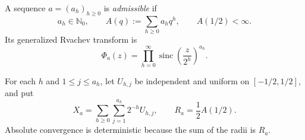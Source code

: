 \documentclass[11pt,oneside]{article}
\numberwithin{equation}{section}
\theoremstyle{definition}
\theoremstyle{remark}
\newcommand{\N}{\mathbb N}
\newcommand{\sinc}{\operatorname{sinc}}
\begin{document}
\begin{definition}
A sequence $a=(a_h)_{h\ge0}$ is \emph{admissible} if
\[
 a_h\in\N_0,
 \qquad
 A(q):=\sum_{h\ge0}a_hq^h,
 \qquad
 A(1/2)<\infty.
\]
Its generalized Rvachev transform is
\begin{equation}
 \Phi_a(z)=\prod_{h=0}^{\infty}
 \sinc\!\left(\frac{z}{2^h}\right)^{a_h}.
 \label{p1:eq:Phi-a}
\end{equation}
\end{definition}

For each $h$ and $1\le j\le a_h$, let $U_{h,j}$ be independent and uniform on
$[-1/2,1/2]$, and put
\begin{equation}
 X_a=\sum_{h\ge0}\sum_{j=1}^{a_h}2^{-h}U_{h,j},
 \qquad
 R_a=\frac12A(1/2).
 \label{p1:eq:X-a}
\end{equation}
Absolute convergence is deterministic because the sum of the radii is $R_a$.
\end{document}
